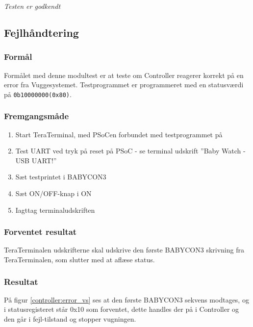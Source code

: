 
\textit{Testen er godkendt}

\subsection*{Fejlhåndtering}

\subsubsection*{Formål}
Formålet med denne modultest er at teste om Controller reagerer korrekt på en error fra Vuggesystemet. Testprogrammet er programmeret med en statusværdi på \verb+0b10000000(0x80)+. 

\subsubsection*{Fremgangsmåde}
\begin{enumerate}
\item Start TeraTerminal, med PSoCen forbundet med testprogrammet på
\item Test UART ved tryk på reset på PSoC - se terminal udskrift ''Baby Watch - USB UART!''
\item Sæt testprintet i BABYCON3
\item Sæt ON/OFF-knap i ON
\item Iagttag terminaludskriften
\end{enumerate}

\subsubsection*{Forventet resultat} 
TeraTerminalen udskrifterne skal udskrive den første BABYCON3 skrivning fra TeraTerminalen, som slutter med at aflæse status. 

\subsubsection*{Resultat} 
På figur \ref{controller:error_vs} ses at den første BABYCON3 sekvens modtages, og i statusregisteret står 0x10 som forventet, dette handles der på i Controller og den går i fejl-tilstand og stopper vugningen.  


